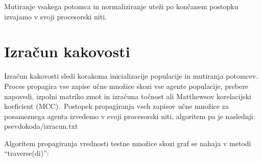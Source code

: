 \documentclass[a4paper,12pt,openright]{book}
\newcommand{\lstlistingslo}{}
\begin{document}
    Mutiranje vsakega potomca in normaliziranje uteži po končanem postopku izvajamo v svoji procesorski niti.


    \section{Izračun kakovosti}\label{sec:izracun-kakovosti}
    Izračun kakovosti sledi korakoma inicializacije populacije in mutiranja potomcev.
    Proces propagira vse zapise učne množice skozi vse agente populacije, prebere napovedi,
    izpolni matriko zmot in izračuna točnost ali Matthewsov korelacijski koeficient (MCC).\ Postopek propagiranja vseh zapisov učne množice za posameznega agenta izvedemo v svoji
    procesorski niti, algoritem pa je naslednji:
    \lstlistingslo{psevdokoda/izracun.txt}

    Algoritem propagiranja vrednosti testne množice skozi graf se nahaja v metodi \enquote{traverse(di)}:
\end{document}
